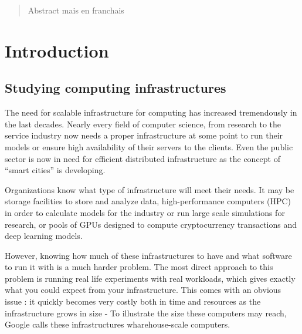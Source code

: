 \documentclass[12pt, a4paper]{memoir}
\begin{document}
\renewcommand\abstractname{R\'esum\'e}
\begin{abstract} 
	Abstract mais en franchais
\end{abstract}

\tableofcontents* %
\normalsize

\mainmatter
\SingleSpace

\chapter{Introduction}

\section{Studying computing infrastructures}

The need for scalable infrastructure for computing has increased tremendously
in the last decades.  Nearly every field of computer science, from research to
the service industry now needs a proper infrastructure at some point to run
their models or ensure high availability of their servers to the clients. Even
the public sector is now in need for efficient distributed infrastructure as
the concept of ``smart cities'' is developing.

Organizations know what type of infrastructure will meet their needs. It may be
storage facilities to store and analyze data, high-performance computers (HPC)
in order to calculate models for the industry or run large scale simulations
for research, or pools of GPUs designed to compute cryptocurrency transactions
and deep learning models.

However, knowing how much of these infrastructures to have and what software to
run it with is a much harder problem. The most direct approach to this problem
is running real life experiments with real workloads, which gives exactly what
you could expect from your infrastructure. This comes with an obvious issue : it
quickly becomes very costly both in time and resources as the infrastructure
grows in size - To illustrate the size these computers may reach, Google calls
these infrastructures wharehouse-scale computers\cite{barroso2018datacenter}.
\end{document}
